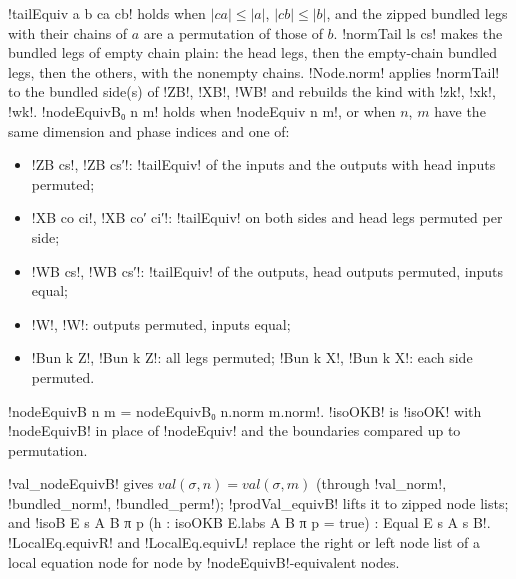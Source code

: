 {\begin{definition}\label{def:boxes-nodeequivB}
\lbx!tailEquiv a b ca cb! holds when $|ca|\le|a|$, $|cb|\le|b|$, and the zipped bundled legs with their chains of $a$ are a permutation of those of $b$. \lbx!normTail ls cs! makes the bundled legs of empty chain plain: the head legs, then the empty-chain bundled legs, then the others, with the nonempty chains. \lbx!Node.norm! applies \lbx!normTail! to the bundled side(s) of \lbx!ZB!, \lbx!XB!, \lbx!WB! and rebuilds the kind with \lbx!zk!, \lbx!xk!, \lbx!wk!. \lbx!nodeEquivB₀ n m! holds when \lbx!nodeEquiv n m!, or when $n$, $m$ have the same dimension and phase indices and one of:
\begin{itemize}
\item \lbx!ZB cs!, \lbx!ZB cs′!: \lbx!tailEquiv! of the inputs and the outputs with head inputs permuted;
\item \lbx!XB co ci!, \lbx!XB co′ ci′!: \lbx!tailEquiv! on both sides and head legs permuted per side;
\item \lbx!WB cs!, \lbx!WB cs′!: \lbx!tailEquiv! of the outputs, head outputs permuted, inputs equal;
\item \lbx!W!, \lbx!W!: outputs permuted, inputs equal;
\item \lbx!Bun k Z!, \lbx!Bun k Z!: all legs permuted; \lbx!Bun k X!, \lbx!Bun k X!: each side permuted.
\end{itemize}
\lbx!nodeEquivB n m = nodeEquivB₀ n.norm m.norm!. \lbx!isoOKB! is \lbx!isoOK! with \lbx!nodeEquivB! in place of \lbx!nodeEquiv! and the boundaries compared up to permutation.
\end{definition}
\lbx!val_nodeEquivB! gives $\mathit{val}(\sigma,n)=\mathit{val}(\sigma,m)$ (through \lbx!val_norm!, \lbx!bundled_norm!, \lbx!bundled_perm!); \lbx!prodVal_equivB! lifts it to zipped node lists; and \lbx!isoB E s A B π p (h : isoOKB E.labs A B π p = true) : Equal E s A s B!. \lbx!LocalEq.equivR! and \lbx!LocalEq.equivL! replace the right or left node list of a local equation node for node by \lbx!nodeEquivB!-equivalent nodes.

}

